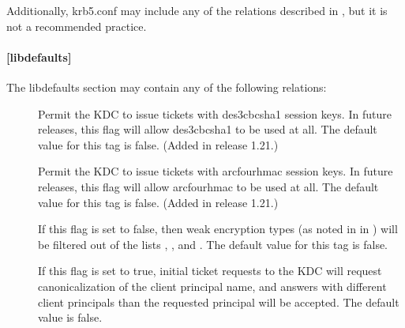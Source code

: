 \documentclass[letterpaper,10pt,english]{sphinxmanual}
\begin{document}
\sphinxAtStartPar
Additionally, krb5.conf may include any of the relations described in
{\hyperref[\detokenize{admin/conf_files/kdc_conf:kdc-conf-5}]{}}, but it is not a recommended practice.


\paragraph{{[}libdefaults{]}}
\label{\detokenize{admin/conf_files/krb5_conf:libdefaults}}\label{\detokenize{admin/conf_files/krb5_conf:id1}}
\sphinxAtStartPar
The libdefaults section may contain any of the following relations:
\begin{description}
\item[{}] \leavevmode
\sphinxAtStartPar
Permit the KDC to issue tickets with des3\sphinxhyphen{}cbc\sphinxhyphen{}sha1 session keys.
In future releases, this flag will allow des3\sphinxhyphen{}cbc\sphinxhyphen{}sha1 to be used
at all.  The default value for this tag is false.  (Added in
release 1.21.)

\item[{}] \leavevmode
\sphinxAtStartPar
Permit the KDC to issue tickets with arcfour\sphinxhyphen{}hmac session keys.
In future releases, this flag will allow arcfour\sphinxhyphen{}hmac to be used
at all.  The default value for this tag is false.  (Added in
release 1.21.)

\item[{}] \leavevmode
\sphinxAtStartPar
If this flag is set to false, then weak encryption types (as noted
in {\hyperref[\detokenize{admin/conf_files/kdc_conf:encryption-types}]{}} in {\hyperref[\detokenize{admin/conf_files/kdc_conf:kdc-conf-5}]{}}) will be filtered
out of the lists ,
, and .  The default
value for this tag is false.

\item[{}] \leavevmode
\sphinxAtStartPar
If this flag is set to true, initial ticket requests to the KDC
will request canonicalization of the client principal name, and
answers with different client principals than the requested
principal will be accepted.  The default value is false.


\end{description}
\end{document}
